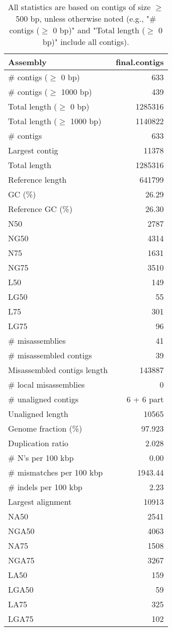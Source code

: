 \documentclass[12pt,a4paper]{article}
\begin{document}
\begin{table}[ht]
\begin{center}
\caption{All statistics are based on contigs of size $\geq$ 500 bp, unless otherwise noted (e.g., "\# contigs ($\geq$ 0 bp)" and "Total length ($\geq$ 0 bp)" include all contigs).}
\begin{tabular}{|l*{1}{|r}|}
\hline
Assembly & final.contigs \\ \hline
\# contigs ($\geq$ 0 bp) & 633 \\ \hline
\# contigs ($\geq$ 1000 bp) & 439 \\ \hline
Total length ($\geq$ 0 bp) & 1285316 \\ \hline
Total length ($\geq$ 1000 bp) & 1140822 \\ \hline
\# contigs & 633 \\ \hline
Largest contig & 11378 \\ \hline
Total length & 1285316 \\ \hline
Reference length & 641799 \\ \hline
GC (\%) & 26.29 \\ \hline
Reference GC (\%) & 26.30 \\ \hline
N50 & 2787 \\ \hline
NG50 & 4314 \\ \hline
N75 & 1631 \\ \hline
NG75 & 3510 \\ \hline
L50 & 149 \\ \hline
LG50 & 55 \\ \hline
L75 & 301 \\ \hline
LG75 & 96 \\ \hline
\# misassemblies & 41 \\ \hline
\# misassembled contigs & 39 \\ \hline
Misassembled contigs length & 143887 \\ \hline
\# local misassemblies & 0 \\ \hline
\# unaligned contigs & 6 + 6 part \\ \hline
Unaligned length & 10565 \\ \hline
Genome fraction (\%) & 97.923 \\ \hline
Duplication ratio & 2.028 \\ \hline
\# N's per 100 kbp & 0.00 \\ \hline
\# mismatches per 100 kbp & 1943.44 \\ \hline
\# indels per 100 kbp & 2.23 \\ \hline
Largest alignment & 10913 \\ \hline
NA50 & 2541 \\ \hline
NGA50 & 4063 \\ \hline
NA75 & 1508 \\ \hline
NGA75 & 3267 \\ \hline
LA50 & 159 \\ \hline
LGA50 & 59 \\ \hline
LA75 & 325 \\ \hline
LGA75 & 102 \\ \hline
\end{tabular}
\end{center}
\end{table}
\end{document}

